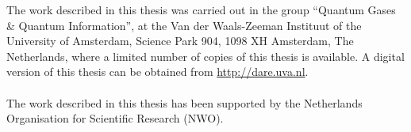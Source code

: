 \begin{titlepage}
	\vfill
    \noindent
	The work described in this thesis was carried out in the group ``Quantum Gases \& Quantum Information'', at the Van der Waals-Zeeman Instituut of the University of Amsterdam, Science Park 904, 1098 XH Amsterdam, The Netherlands, where a limited number of copies of this thesis is available. A digital version of this thesis can be obtained from \href{http://dare.uva.nl}{http://dare.uva.nl}.\\\\
    \noindent
	The work described in this thesis has been supported by the Netherlands Organisation for Scientific Research (NWO).\\\\\\
	
	

     

    
  \thispagestyle{empty}
\end{titlepage}
